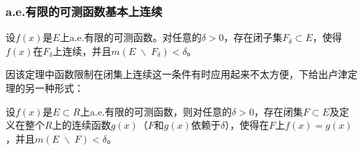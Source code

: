\subsubsection{a.e.有限的可测函数基本上连续}
\begin{theorem}[卢津定理]
	设$f(x)$是$E$上a.e.有限的可测函数。对任意的$\delta>0$，存在闭子集$F_\delta\subset E$，使得$f(x)$在$F_\delta$上连续，并且$m(E\;\backslash\;F_\delta)<\delta$。
\end{theorem}
因该定理中函数限制在闭集上连续这一条件有时应用起来不太方便，下给出卢津定理的另一种形式：
\begin{theorem}
	设$f(x)$是$E\subset R$上a.e.有限的可测函数，则对任意的$\delta>0$，存在闭集$F\subset E$及定义在整个$R$上的连续函数$g(x)$（$F$和$g(x)$依赖于$\delta$），使得在$F$上$f(x)=g(x)$，并且$m(E\;\backslash\;F)<\delta$。
\end{theorem}


